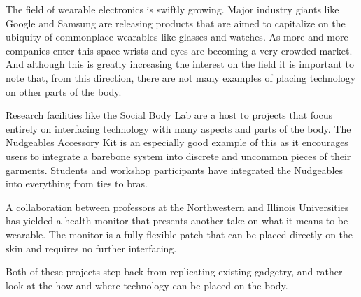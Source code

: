 
The field of wearable electronics is swiftly growing. Major industry giants like Google and Samsung are releasing products that are aimed to capitalize on the ubiquity of commonplace wearables like glasses and watches. As more and more companies enter this space wrists and eyes are becoming a very crowded market. And although this is greatly increasing the interest on the field it is important to note that, from this direction, there are not many examples of placing technology on other parts of the body.

Research facilities like the Social Body Lab are a host to projects that focus entirely on interfacing technology with many aspects and parts of the body. The Nudgeables Accessory Kit is an especially good example of this as it encourages users to integrate a barebone system into discrete and uncommon pieces of their garments. Students and workshop participants have integrated the Nudgeables into everything from ties to bras. 

A collaboration between professors at the Northwestern and Illinois Universities has yielded a health monitor that presents another take on what it means to be wearable. The monitor is a fully flexible patch that can be placed directly on the skin and requires no further interfacing. 

Both of these projects step back from replicating existing gadgetry, and rather look at the how and where technology can be placed on the body.